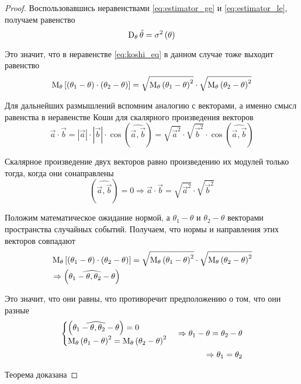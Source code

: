 \begin{proof}
  Воспользовавшись неравенствами
  \eqref{eq:estimator_ge} и \eqref{eq:estimator_le}, получаем равенство
  $$\operatorname{D}_{\theta} \tilde{\theta}=\sigma^2\left(\theta\right)$$

  Это значит, что в неравенстве \eqref{eq:koshi_eq}
  в данном случае тоже выходит равенство
  $$\operatorname{M}_{\theta} \left[ \left( \theta_1-\theta \right)
      \cdot\left( \theta_2-\theta \right) \right]
    =\sqrt{\operatorname{M}_{\theta} \left( \theta_1-\theta \right)^2}
      \cdot\sqrt{\operatorname{M}_{\theta} \left( \theta_2-\theta \right)^2}$$

  Для дальнейших размышлений вспомним аналогию с векторами,
  а именно смысл равенства в неравенстве Коши
  для скалярного произведения векторов
  $$\vec{a}\cdot\vec{b}
    =\left|\vec{a}\right|\cdot\left|\vec{b}\right|
      \cdot\cos{\left(\widehat{\vec{a},\vec{b}}\right)}
    =\sqrt{\vec{a}^2}\cdot\sqrt{\vec{b}^2}
      \cdot\cos{\left(\widehat{\vec{a},\vec{b}}\right)}$$

  Скалярное произведение двух векторов равно произведению их модулей
  только тогда, когда они сонаправлены
  $$\left(\widehat{\vec{a},\vec{b}}\right)=0
    \Rightarrow \vec{a}\cdot\vec{b}
    =\sqrt{\vec{a}^2}\cdot\sqrt{\vec{b}^2}$$

  Положим математическое ожидание нормой,
  а $\theta_1-\theta$ и $\theta_2-\theta$ векторами
  пространства случайных событий.
  Получаем, что нормы и направления этих векторов совпадают
  \begin{align*}
    &\operatorname{M}_{\theta} \left[ \left( \theta_1-\theta \right)
      \cdot\left( \theta_2-\theta \right) \right]
    =\sqrt{\operatorname{M}_{\theta} \left( \theta_1-\theta \right)^2}
      \cdot\sqrt{\operatorname{M}_{\theta} \left( \theta_2-\theta \right)^2}\\
    &\Rightarrow\left(\widehat{\theta_1-\theta,\theta_2-\theta}\right)\\
    \end{align*}

  Это значит, что они равны,
  что противоречит предположению о том, что они разные
  \begin{align*}
    \begin{cases}
      \left(\widehat{\theta_1-\theta,\theta_2-\theta}\right)=0\\
      \operatorname{M}_{\theta} \left( \theta_1-\theta \right)^2
        =\operatorname{M}_{\theta} \left( \theta_2-\theta \right)^2
    \end{cases}
    \Rightarrow \theta_1-\theta=\theta_2-\theta\\
    \Rightarrow\theta_1=\theta_2
  \end{align*}

  Теорема доказана
\end{proof}


